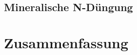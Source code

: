 \documentclass[12pt,titlepage]{scrartcl}
\begin{document}
\subsection{Mineralische N-Düngung}
\label{subsec:Dis:minN}

\section{Zusammenfassung}
\label{sec:Zusammenfassung}

\begin{singlespace} %
\begin{flushleft} %
\printbibliography[title=Literaturverzeichnis]
\end{flushleft}
\end{singlespace}

\end{document}
